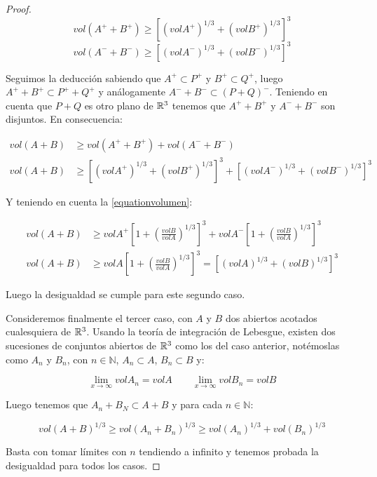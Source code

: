 \begin{proof}
\begin{equation*}
    vol (A^+ + B^+) \geq \left[ (vol A^+)^{1/3} + (vol B^+)^{1/3} \right]^3
\end{equation*}
\begin{equation*}
    vol (A^- + B^-) \geq \left[ (vol A^-)^{1/3} + (vol B^-)^{1/3} \right]^3
\end{equation*}

Seguimos la deducción sabiendo que $A^+ \subset P^+$ y $B^+ \subset Q^+$, luego $A^+ + B^+ \subset P^+ + Q^+$ y análogamente $A^- + B^- \subset (P+Q)^-$. Teniendo en cuenta que $P+Q$ es otro plano de $\mathbb{R}^3$ tenemos que $A^+ + B^+$ y $A^- + B^-$ son disjuntos. En consecuencia:

\begin{align*}
    vol (A+B) &\geq vol(A^+ + B^+) + vol(A^- + B^-) \\ 
    vol (A+B) &\geq \left[ (vol A^+)^{1/3} + (vol B^+)^{1/3} \right]^3 + \left[ (vol A^-)^{1/3} + (vol B^-)^{1/3} \right]^3
\end{align*}

Y teniendo en cuenta la \autoref{equationvolumen}:

\begin{align*}
    vol (A+B) &\geq vol A^+ \left[ 1 + \left( \frac{vol B}{vol A} \right)^{1/3}  \right]^3 + vol A^- \left[ 1 + \left( \frac{vol B}{vol A} \right)^{1/3}  \right]^3 \\
    vol (A+B) &\geq vol A \left[ 1 + \left( \frac{vol B}{vol A} \right)^{1/3}  \right]^3 = \left[ (vol A)^{1/3} + (vol B)^{1/3} \right]^3
\end{align*}

Luego la desigualdad se cumple para este segundo caso.

Consideremos finalmente el tercer caso, con $A$ y $B$ dos abiertos acotados cualesquiera de $\mathbb{R}^3$. Usando la teoría de integración de Lebesgue, existen dos sucesiones de conjuntos abiertos de $\mathbb{R}^3$ como los del caso anterior, notémoslas como $A_n$ y $B_n$, con $n \in \mathbb{N}$, $A_n \subset A$, $B_n \subset B$ y:

\begin{equation*}
    \lim_{x \to \infty} vol A_n = vol A \qquad \lim_{x \to \infty} vol B_n = vol B
\end{equation*}

Luego tenemos que $A_n + B_N \subset A + B$ y para cada $n \in \mathbb{N}$:

\begin{equation*}
    vol (A+B)^{1/3} \geq vol (A_n+B_n)^{1/3} \geq vol (A_n) ^{1/3} + vol(B_n)^{1/3}
\end{equation*}

Basta con tomar límites con $n$ tendiendo a infinito y tenemos probada la desigualdad para todos los casos.
\end{proof}

